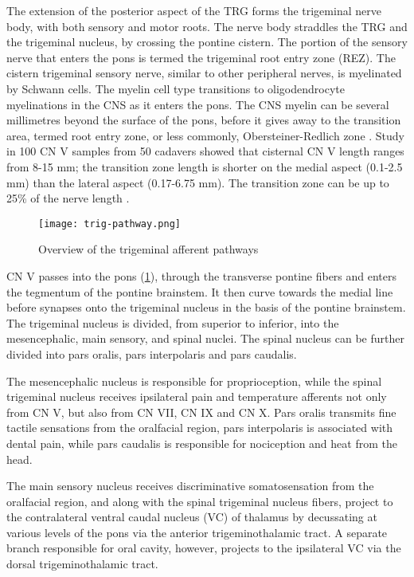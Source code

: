 The extension of the posterior aspect of the TRG forms the trigeminal nerve body, with both sensory and motor roots. The nerve body straddles the TRG and the trigeminal nucleus, by crossing the pontine cistern. The portion of the sensory nerve that enters the pons is termed the trigeminal root entry zone (REZ). The cistern trigeminal sensory nerve, similar to other peripheral nerves, is myelinated by Schwann cells. The myelin cell type transitions to oligodendrocyte myelinations in the CNS as it enters the pons. The CNS myelin can be several millimetres beyond the surface of the pons, before it gives away to the transition area, termed root entry zone, or less commonly, Obersteiner-Redlich zone \cite{Peker2006}. Study in 100 CN V samples from 50 cadavers showed that cisternal CN V length ranges from 8-15 mm; the transition zone length is shorter on the medial aspect (0.1-2.5 mm) than the lateral aspect (0.17-6.75 mm). The transition zone can be up to 25\% of the nerve length \cite{Peker2006}. 

 \begin{figure}[ht]
 \texttt{[image: trig-pathway.png]}
 \centering
 \caption{Overview of the trigeminal afferent pathways}
 \label{fig:trig-pathway}
 \end{figure}
 
CN V passes into the pons (\ref{fig:trig-pathway}), through the transverse pontine fibers and enters the tegmentum of the pontine brainstem. It then curve towards the medial line before synapses onto the trigeminal nucleus in the basis of the pontine brainstem. The trigeminal nucleus is divided, from superior to inferior, into the mesencephalic, main sensory, and spinal nuclei. The spinal nucleus can be further divided into pars oralis, pars interpolaris and pars caudalis. 

The mesencephalic nucleus is responsible for proprioception, while the spinal trigeminal nucleus receives ipsilateral pain and temperature afferents not only from CN V, but also from CN VII, CN IX and CN X. Pars oralis transmits fine tactile sensations from the oralfacial region, pars interpolaris is associated with dental pain, while pars caudalis is responsible for nociception and heat from the head. 

The main sensory nucleus receives discriminative somatosensation from the oralfacial region, and along with the spinal trigeminal nucleus fibers, project to the contralateral ventral caudal nucleus (VC) of thalamus by decussating at various levels of the pons via the anterior trigeminothalamic tract. A separate branch responsible for oral cavity, however, projects to the ipsilateral VC via the dorsal trigeminothalamic tract.  

